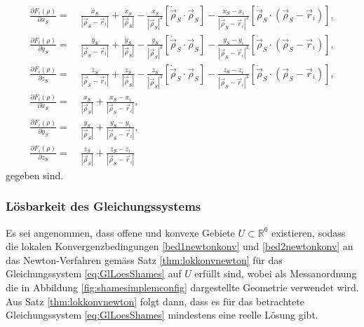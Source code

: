 \documentclass[a4paper,12pt]{article}
\numberwithin{equation}{section}
\begin{document}
\begin{align}
\frac{\partial F_i(\rho)}{\partial x_S} 
=&\; \frac{\dot{x}_S}{|\vec{\rho}_S-\vec{r}_i|}+\frac{\dot{x}_S}{|\vec{\rho}_S|}-\frac{x_S}{|\vec{\rho}_S|^3}[\dot{\vec{\rho}}_S\cdot\vec{\rho}_S]-\frac{x_S-x_i}{|\vec{\rho}_S-\vec{r}_i|^3}[\dot{\vec{\rho}}_S\cdot(\vec{\rho}_S-\vec{r}_i)], \\
\frac{\partial F_i(\rho)}{\partial y_S} 
=&\; \frac{\dot{y}_S}{|\vec{\rho}_S-\vec{r}_i|}+\frac{\dot{y}_S}{|\vec{\rho}_S|}-\frac{y_S}{|\vec{\rho}_S|^3}[\dot{\vec{\rho}}_S\cdot\vec{\rho}_S]-\frac{y_S-y_i}{|\vec{\rho}_S-\vec{r}_i|^3}[\dot{\vec{\rho}}_S\cdot(\vec{\rho}_S-\vec{r}_i)], \\
\frac{\partial F_i(\rho)}{\partial z_S} 
=&\; \frac{\dot{z}_S}{|\vec{\rho}_S-\vec{r}_i|}+\frac{\dot{z}_S}{|\vec{\rho}_S|}-\frac{z_S}{|\vec{\rho}_S|^3}[\dot{\vec{\rho}}_S\cdot\vec{\rho}_S]-\frac{z_S-z_i}{|\vec{\rho}_S-\vec{r}_i|^3}[\dot{\vec{\rho}}_S\cdot(\vec{\rho}_S-\vec{r}_i)], \\
\frac{\partial F_i(\rho)}{\partial \dot{x}_S} =&\;  \frac{x_S}{|\vec{\rho}_S|}+\frac{x_S-x_i}{|\vec{\rho}_S-\vec{r}_i|}, \\
\frac{\partial F_i(\rho)}{\partial \dot{y}_S} =&\;  \frac{y_S}{|\vec{\rho}_S|}+\frac{y_S-y_i}{|\vec{\rho}_S-\vec{r}_i|}, \\
\frac{\partial F_i(\rho)}{\partial \dot{z}_S} =&\;  \frac{z_S}{|\vec{\rho}_S|}+\frac{z_S-z_i}{|\vec{\rho}_S-\vec{r}_i|}
\end{align} gegeben sind. 

\subsubsection{Lösbarkeit des Gleichungssystems}\label{sec:loesbarkeit}
Es sei angenommen, dass offene und konvexe Gebiete $U \subset \mathbb{R}^6$ existieren, sodass die lokalen Konvergenzbedingungen \ref{bed1newtonkonv} und \ref{bed2newtonkonv} an das Newton-Verfahren gemäss Satz \ref{thm:lokkonvnewton} für das Gleichungssystem \eqref{eq:GlLoesShames} auf $U$ erfüllt sind, wobei als Messanordnung die in Abbildung \ref{fig:shamesimplemconfig} dargestellte Geometrie verwendet wird. Aus Satz \ref{thm:lokkonvnewton} folgt dann, dass es für das betrachtete Gleichungssystem \eqref{eq:GlLoesShames} mindestens eine reelle Lösung gibt.
\end{document}
